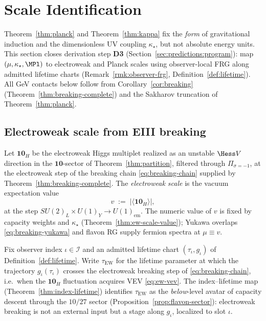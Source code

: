 \section{Scale Identification}
\label{sec:scales}

Theorem~\ref{thm:planck} and Theorem~\ref{thm:kappa} fix the \emph{form} of
gravitational induction and the dimensionless UV coupling $\kappa_\star$, but
not absolute energy units. This section closes derivation step \textbf{D3}
(Section~\ref{sec:predictions:program}): map $(\mu,\kappa_\star,\MPl)$ to
electroweak and Planck scales using observer-local FRG along admitted lifetime
charts (Remark~\ref{rmk:observer-frg}, Definition~\ref{def:lifetime}). All
GeV contacts below follow from Corollary~\ref{cor:breaking}
(Theorem~\ref{thm:breaking-complete}) and the Sakharov truncation of
Theorem~\ref{thm:planck}.

\subsection{Electroweak scale from EIII breaking}
\label{sec:scales:ew}

\begin{definition}\label{def:ew-scale}
Let $\mathbf{10}_H$ be the electroweak Higgs multiplet realized as an
unstable $\Hess V$ direction in the $\mathbf{10}$-sector of
Theorem~\ref{thm:partition}, filtered through $\Pi_{\sigma=-1}$, at the
electroweak step of the breaking chain \eqref{eq:breaking-chain} supplied by
Theorem~\ref{thm:breaking-complete}. The \emph{electroweak scale} is the
vacuum expectation value
\begin{equation}\label{eq:ew-vev}
  v \;:=\; \bigl|\langle \mathbf{10}_H\rangle\bigr|,
\end{equation}
at the step $SU(2)_L\times U(1)_Y\to U(1)_{\mathrm{em}}$. The numeric value
of $v$ is fixed by capacity weights and $\kappa_\star$
(Theorem~\ref{thm:ew-scale-value}); Yukawa overlaps
\eqref{eq:breaking-yukawa} and flavon RG supply fermion spectra at $\mu\equiv v$.
\end{definition}

\begin{remark}
\label{rmk:tau-ew}
Fix observer index $\iota\in\mathcal{I}$ and an admitted lifetime chart
$(\tau_\iota,g_\iota)$ of Definition~\ref{def:lifetime}. Write
$\tau_{\mathrm{EW}}$ for the lifetime parameter at which the trajectory
$g_\iota(\tau_\iota)$ crosses the electroweak breaking step of
\eqref{eq:breaking-chain}, i.e.\ when the $\mathbf{10}_H$ fluctuation
acquires VEV \eqref{eq:ew-vev}. The index--lifetime map
(Theorem~\ref{thm:index-lifetime}) identifies $\tau_{\mathrm{EW}}$ as the
\emph{below}-level avatar of capacity descent through the $10/27$ sector
(Proposition~\ref{prop:flavon-sector}): electroweak breaking is not an
external input but a stage along $g_\iota$, localized to slot $\iota$.
\end{remark}

